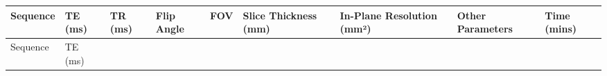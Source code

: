 \documentclass[
true
]{sn-jnl}
\begin{document}
\begin{longtable}[]{@{}
  >{\raggedright\arraybackslash}p{}
  >{\raggedright\arraybackslash}p{}
  >{\raggedright\arraybackslash}p{}
  >{\raggedright\arraybackslash}p{}
  >{\raggedright\arraybackslash}p{}
  >{\raggedright\arraybackslash}p{}
  >{\raggedright\arraybackslash}p{}
  >{\raggedright\arraybackslash}p{}
  >{\raggedright\arraybackslash}p{}@{}}
\toprule\noalign{}
\begin{minipage}[b]{\linewidth}\raggedright
Sequence
\end{minipage} & \begin{minipage}[b]{\linewidth}\raggedright
TE (ms)
\end{minipage} & \begin{minipage}[b]{\linewidth}\raggedright
TR (ms)
\end{minipage} & \begin{minipage}[b]{\linewidth}\raggedright
Flip Angle
\end{minipage} & \begin{minipage}[b]{\linewidth}\raggedright
FOV
\end{minipage} & \begin{minipage}[b]{\linewidth}\raggedright
Slice Thickness (mm)
\end{minipage} & \begin{minipage}[b]{\linewidth}\raggedright
In-Plane Resolution (mm²)
\end{minipage} & \begin{minipage}[b]{\linewidth}\raggedright
Other Parameters
\end{minipage} & \begin{minipage}[b]{\linewidth}\raggedright
Time (mins)
\end{minipage} \\
\midrule\noalign{}
\endfirsthead
\toprule\noalign{}
\begin{minipage}[b]{\linewidth}\raggedright
Sequence
\end{minipage} & \begin{minipage}[b]{\linewidth}\raggedright
TE (ms)
\end{minipage} & \begin{minipage}[b]{\linewidth}\raggedright

\end{minipage}
\end{longtable}
\end{document}
